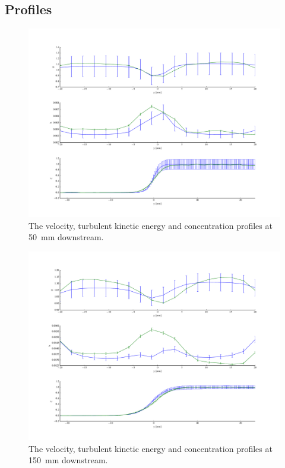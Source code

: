 \documentclass[11 pt]{article}
\begin{document}
\clearpage
\begin{appendices}

	\section{Profiles} \label{ap:profiles}
		\begin{figure}[h]
			\centering
			\includegraphics[width=\textwidth]{three_050.pdf}
			\caption{The velocity, turbulent kinetic energy and concentration profiles at \SI{50}{mm} downstream. }
		\end{figure}
		\begin{figure}[h]
			\centering
			\includegraphics[width=\textwidth]{three_150.pdf}
			\caption{The velocity, turbulent kinetic energy and concentration profiles at \SI{150}{mm} downstream. }

\end{figure}
\end{appendices}
\end{document}

